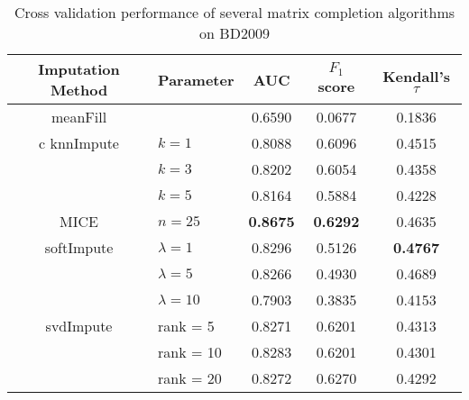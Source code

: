 \begin{table}[htbp]
\centering
\begin{tabular}{cl||ccc}
\toprule
Imputation Method & Parameter & AUC & $F_1$ score & Kendall's $\tau$ \\
\midrule 
meanFill &   & 0.6590  & 0.0677 & 0.1836 \\
\midrule c
knnImpute & $k = 1$ & 0.8088 & 0.6096 & 0.4515\\
  & $k = 3$ & 0.8202 & 0.6054 & 0.4358 \\
  & $k = 5$ & 0.8164 & 0.5884 & 0.4228 \\
\midrule
MICE & $n = 25$ & \bf{0.8675} & \bf{0.6292} & 0.4635 \\
\midrule
softImpute & $\lambda=1$ & 0.8296 & 0.5126 & \bf{0.4767} \\
& $\lambda=5$ & 0.8266 & 0.4930 & 0.4689 \\
& $\lambda=10$ & 0.7903 & 0.3835 & 0.4153 \\
\midrule
svdImpute & rank = 5 & 0.8271 & 0.6201 & 0.4313 \\
& rank = 10 & 0.8283 & 0.6201 & 0.4301 \\
& rank = 20 & 0.8272 & 0.6270 & 0.4292  \\
\bottomrule[1.25pt]
\end{tabular}
\begin{center}
\caption{Cross validation performance of several matrix completion algorithms on BD2009} \label{tab:imputation}
\end{center}
\end{table}

